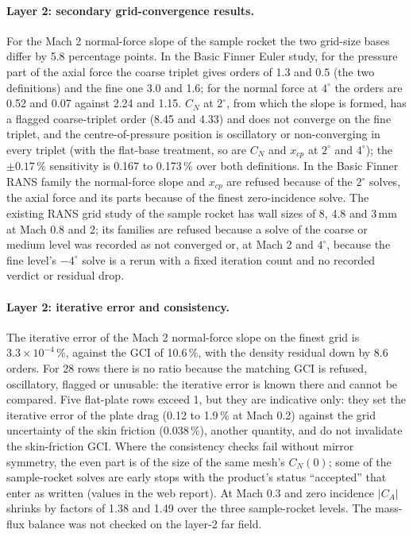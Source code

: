 \documentclass[twocolumn]{labreport}
\begin{document}
\paragraph{Layer 2: secondary grid-convergence results.}
For the Mach 2 normal-force slope of the sample rocket the two grid-size bases differ by 5.8 percentage points.
In the Basic Finner Euler study, for the pressure part of the axial force the coarse triplet gives orders of 1.3 and 0.5 (the two definitions) and the fine one 3.0 and 1.6; for the normal force at $4^\circ$ the orders are 0.52 and 0.07 against 2.24 and 1.15.
$C_N$ at $2^\circ$, from which the slope is formed, has a flagged coarse-triplet order (8.45 and 4.33) and does not converge on the fine triplet, and the centre-of-pressure position is oscillatory or non-converging in every triplet (with the flat-base treatment, so are $C_N$ and $x_{cp}$ at $2^\circ$ and $4^\circ$); the $\pm0.17\,\%$ sensitivity is 0.167 to 0.173\,\% over both definitions.
In the Basic Finner RANS family the normal-force slope and $x_{cp}$ are refused because of the $2^\circ$ solves, the axial force and its parts because of the finest zero-incidence solve.
The existing RANS grid study of the sample rocket has wall sizes of 8, 4.8 and 3\,mm at Mach 0.8 and 2; its families are refused because a solve of the coarse or medium level was recorded as not converged or, at Mach 2 and $4^\circ$, because the fine level's $-4^\circ$ solve is a rerun with a fixed iteration count and no recorded verdict or residual drop.

\paragraph{Layer 2: iterative error and consistency.}
The iterative error of the Mach 2 normal-force slope on the finest grid is $3.3\times10^{-4}\,\%$, against the GCI of 10.6\,\%, with the density residual down by 8.6 orders.
For 28 rows there is no ratio because the matching GCI is refused, oscillatory, flagged or unusable: the iterative error is known there and cannot be compared.
Five flat-plate rows exceed 1, but they are indicative only: they set the iterative error of the plate drag (0.12 to 1.9\,\% at Mach 0.2) against the grid uncertainty of the skin friction (0.038\,\%), another quantity, and do not invalidate the skin-friction GCI.
Where the consistency checks fail without mirror symmetry, the even part is of the size of the same mesh's $C_N(0)$; some of the sample-rocket solves are early stops with the product's status ``accepted'' that enter as written (values in the web report).
At Mach 0.3 and zero incidence $|C_A|$ shrinks by factors of 1.38 and 1.49 over the three sample-rocket levels.
The mass-flux balance was not checked on the layer-2 far field.
\end{document}
